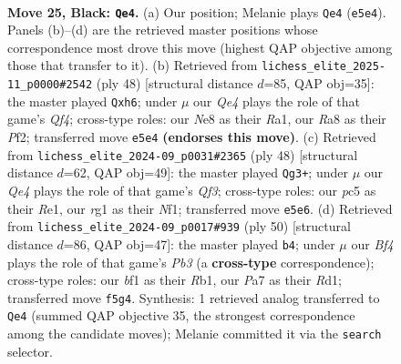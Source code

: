 \documentclass[11pt]{article}
\begin{document}
\clearpage

\begin{figure}[p]\centering
\begin{subfigure}{0.46\textwidth}\centering
\resizebox{\linewidth}{!}{%
\newchessgame
\chessboard[
  setfen={r2rn1k1/p1p2p2/6p1/2Ppqb1p/3N1P2/1P2P1P1/3BR2P/Q2K1BR1 b - - 0 25},
  showmover=false,
  pgfstyle=straightmove, color=movearrow, markmove={e5-e4}
]}
\caption{}
\end{subfigure}\hfill
\begin{subfigure}{0.46\textwidth}\centering
\resizebox{\linewidth}{!}{%
\newchessgame
\chessboard[
  setfen={r2r3k/1b3q1p/p1n1pNpb/1p2P3/2p2Q2/2P3P1/PP3PB1/R3R1K1 w - - 0 25},
  showmover=false,
  pgfstyle=straightmove, color=movearrow, markmove={f4-h6}
]}
\caption{}
\end{subfigure}
\\[4pt]
\begin{subfigure}{0.46\textwidth}\centering
\resizebox{\linewidth}{!}{%
\newchessgame
\chessboard[
  setfen={3r1bk1/p2rnq2/1p5p/2p2p2/4p3/1PP1BQ1P/P4PP1/R3RNK1 w - - 0 25},
  showmover=false,
  pgfstyle=straightmove, color=movearrow, markmove={f3-g3}
]}
\caption{}
\end{subfigure}\hfill
\begin{subfigure}{0.46\textwidth}\centering
\resizebox{\linewidth}{!}{%
\newchessgame
\chessboard[
  setfen={2r1rbk1/2q2p1p/1p2p1p1/p1n1P3/2QB1P2/PP4PP/6BK/1R1R4 w - - 0 26},
  showmover=false,
  pgfstyle=straightmove, color=movearrow, markmove={b3-b4}
]}
\caption{}
\end{subfigure}
\caption{\textbf{Move 25, Black: \texttt{Qe4}.} (a) Our position; Melanie plays \texttt{Qe4} (\texttt{e5e4}). Panels (b)--(d) are the retrieved master positions whose correspondence most drove this move (highest QAP objective among those that transfer to it). (b) Retrieved from \texttt{lichess\_elite\_2025-11\_p0000\#2542} (ply 48) [structural distance $d$=85, QAP obj=35]: the master played \texttt{Qxh6}; under $\mu$ our \emph{Qe4} plays the role of that game's \emph{Qf4}; cross-type roles: our \emph{N}e8 as their \emph{R}a1, our \emph{R}a8 as their \emph{P}f2; transferred move \texttt{e5e4} \textbf{(endorses this move)}. (c) Retrieved from \texttt{lichess\_elite\_2024-09\_p0031\#2365} (ply 48) [structural distance $d$=62, QAP obj=49]: the master played \texttt{Qg3+}; under $\mu$ our \emph{Qe4} plays the role of that game's \emph{Qf3}; cross-type roles: our \emph{p}c5 as their \emph{R}e1, our \emph{r}g1 as their \emph{N}f1; transferred move \texttt{e5e6}. (d) Retrieved from \texttt{lichess\_elite\_2024-09\_p0017\#939} (ply 50) [structural distance $d$=86, QAP obj=47]: the master played \texttt{b4}; under $\mu$ our \emph{Bf4} plays the role of that game's \emph{Pb3} (a \textbf{cross-type} correspondence); cross-type roles: our \emph{b}f1 as their \emph{R}b1, our \emph{P}a7 as their \emph{R}d1; transferred move \texttt{f5g4}. Synthesis: 1 retrieved analog transferred to \texttt{Qe4} (summed QAP objective 35, the strongest correspondence among the candidate moves); Melanie committed it via the \texttt{search} selector.}
\label{fig:thought-m49}
\end{figure}
\end{document}
